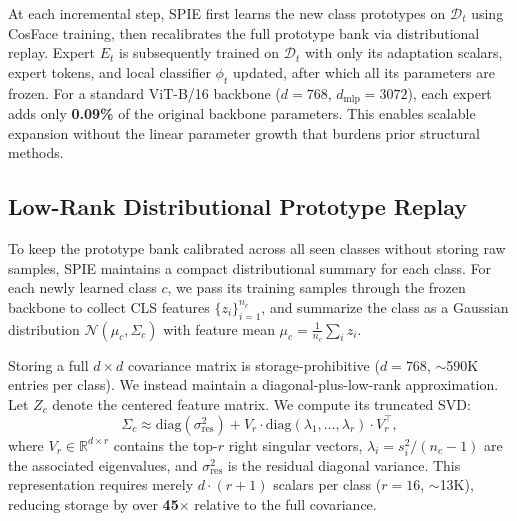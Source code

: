 At each incremental step, SPIE first learns the new class prototypes on $\mathcal{D}_t$ using CosFace training, then recalibrates the full prototype bank via distributional replay. Expert $E_t$ is subsequently trained on $\mathcal{D}_t$ with only its adaptation scalars, expert tokens, and local classifier $\phi_t$ updated, after which all its parameters are frozen. For a standard ViT-B/16 backbone ($d=768$, $d_{\text{mlp}}=3072$), each expert adds only \textbf{0.09\%} of the original backbone parameters. This enables scalable expansion without the linear parameter growth that burdens prior structural methods.

\subsection{Low-Rank Distributional Prototype Replay}
\label{sec:prototypes}

To keep the prototype bank calibrated across all seen classes without storing raw samples, SPIE maintains a compact distributional summary for each class. For each newly learned class $c$, we pass its training samples through the frozen backbone to collect CLS features $\{z_i\}_{i=1}^{n_c}$, and summarize the class as a Gaussian distribution $\mathcal{N}(\mu_c, \Sigma_c)$ with feature mean $\mu_c = \frac{1}{n_c}\sum_{i} z_i$.

Storing a full $d \times d$ covariance matrix is storage-prohibitive ($d=768$, $\sim$590K entries per class). We instead maintain a diagonal-plus-low-rank approximation. Let $Z_c$ denote the centered feature matrix. We compute its truncated SVD:
\begin{equation}
\Sigma_c \approx \text{diag}(\sigma_{\text{res}}^2) + V_r \cdot \text{diag}(\lambda_1, \dots, \lambda_r) \cdot V_r^\top,
\label{eq:lowrank_cov}
\end{equation}
where $V_r \in \mathbb{R}^{d \times r}$ contains the top-$r$ right singular vectors, $\lambda_i = s_i^2/(n_c-1)$ are the associated eigenvalues, and $\sigma_{\text{res}}^2$ is the residual diagonal variance. This representation requires merely $d \cdot (r+1)$ scalars per class ($r=16$, $\sim$13K), reducing storage by over \textbf{45$\times$} relative to the full covariance.

